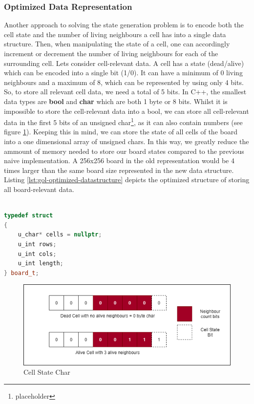 \documentclass[a4paper,german,12pt,twoside=false]{scrartcl} %
\begin{document}
\subsubsection{Optimized Data Representation}

Another approach to solving the state generation problem is to encode both the cell state and the number of living neighbours a cell has into a single data structure. Then, when manipulating the state of a cell, one can accordingly increment or decrement the number of living neighbours for each of the surrounding cell. Lets consider cell-relevant data. A cell has a state (dead/alive) which can be encoded into a single bit (1/0). It can have a minimum of 0 living neighbours and a maximum of 8, which can be represented by using only 4 bits. So, to store all relevant cell data, we need a total of 5 bits. In C++, the smallest data types are \textbf{bool} and \textbf{char} which are both 1 byte or 8 bits. Whilst it is impossible to store the cell-relevant data into a bool, we can store all cell-relevant data in the first 5 bits of an unsigned char\footnote{placeholder}, as it can also contain numbers (see figure \ref{fig:cell-state}). Keeping this in mind, we can store the state of all cells of the board into a one dimensional array of unsigned chars. In this way, we greatly reduce the ammount of memory needed to store our board states compared to the previous naive implementation. A 256x256 board in the old representation would be 4 times larger than the same board size represented in the new data structure. Listing \ref{lst:gol-optimized-datastructure} depicts the optimized structure of storing all board-relevant data.

\pagebreak

\begin{lstlisting}[caption={Parallel Naive State Generation Algorithm},label={lst:gol-optimized-datastructure},language=C++]

typedef struct
{
    u_char* cells = nullptr;
    u_int rows;
    u_int cols;
    u_int length;
} board_t;

\end{lstlisting}

\begin{figure}[tbh!]
	\centering
	\includegraphics[width=16cm]{imgs/cell-state.png}
	\caption{Cell State Char}
	\label{fig:cell-state}
\end{figure}
\end{document}
